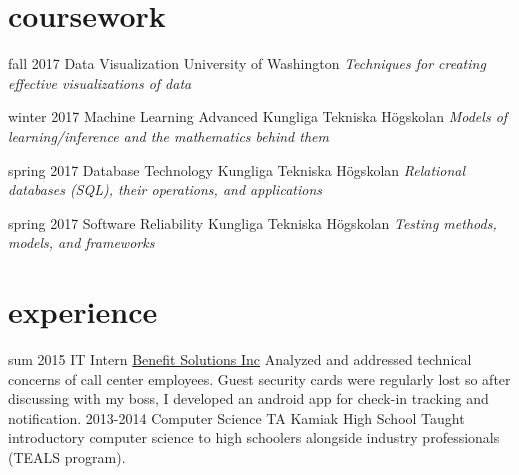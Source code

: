 \documentclass[]{friggeri-cv}
\begin{document}
\section{coursework}

\begin{entrylist}
  \entry
    {fall 2017}
    {Data Visualization}
    {University of Washington}
    {\emph{Techniques for creating effective visualizations of data}}

  \entry
    {winter 2017}
    {Machine Learning Advanced}
    {Kungliga Tekniska Högskolan}
    {\emph{Models of learning/inference and the mathematics behind them}}


  \entry
    {spring 2017}
    {Database Technology}
    {Kungliga Tekniska Högskolan}
    {\emph{Relational databases (SQL), their operations, and applications}}

  \entry
    {spring 2017}
    {Software Reliability}
    {Kungliga Tekniska Högskolan}
    {\emph{Testing methods, models, and frameworks}}



\end{entrylist}

\section{experience}

\begin{entrylist}
  \entry
    {sum 2015}
    {IT Intern}
    {\href{http://www.bsitpa.com/}{Benefit Solutions Inc}}
    {Analyzed and addressed technical concerns of call center employees. Guest security cards were regularly lost so after discussing with my boss, I developed an android app for check-in tracking and notification.}
  \entry
    {2013-2014}
    {Computer Science TA}
    {Kamiak High School}
    {Taught introductory computer science to high schoolers alongside industry professionals (TEALS program).}
\end{entrylist}
\end{document}
